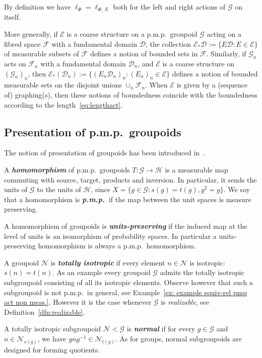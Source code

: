 \documentclass[AHL,Unicode,longabstracts,published]{cedram}
\newcommand{\defin}[1]{\textbf{\emph{#1}}}
\newcommand{\coarse}{\mathcal{E}}
\newcommand{\cn}{\mathcal{N}}
\newcommand{\ch}{\mathcal{H}}
\newcommand{\cg}{\mathcal{G}}
\newcommand{\cf}{\mathcal{F}}
\newcommand{\cd}{\mathcal{D}}
\newcommand{\pmp}{p.m.p.\ }
\begin{document}
By definition we have $\ell_\Phi=\ell_{\Phi,\,X}$ both for the left and right actions of $\cg$ on itself.

More generally, if $\coarse$ is a coarse structure on a \pmp groupoid $\cg$ acting on a fibred space $\cf$ with a fundamental domain $\cd$, the collection $\coarse_* \cd := \{ E \cd: E \in \coarse\}$ of measurable subsets of $\cf$ defines a notion of bounded sets in $\cf$. Similarly, if $\cg_n$ acts on $\cf_n$ with a fundamental domain $\cd_n$, and $\coarse$ is a coarse structure on $(\cg_n)_n$, then $\coarse_* (\cd_n) := \{ (E_n \cd_n)_n: (E_n)_n \in \coarse\}$ defines a notion of bounded measurable sets on the disjoint unions $\cup_n \cf_n$. When $\coarse$ is given by a (sequence of) graphing(s), then these notions of boundedness coincide with the boundedness according to the length~\eqref{eq:lengthact}.


\subsection{Presentation of \pmp groupoids}\label{subsect: presentation of groupoids}

The notion of presentation of groupoids has been introduced in~\cite{Alv08}.

\begin{defi}\label{def:groupoid_homomorphism}
A \defin{homomorphism} of \pmp groupoids $T:\cg\rightarrow \ch$ is a measurable map commuting with source, target, products and inversion. In particular, it sends the units of $\cg$ to the units of $\ch$, since $X=\{g\in \cg: s(g) = t(g),g^2=g\}$. We say that a homomorphism is
\defin{\pmp}if the map between the unit spaces is measure preserving.

A homomorphism of groupoids is \defin{units-preserving} if the induced map at the level of units is an isomorphism of probability spaces. In particular a units-preserving homomorphism is always a \pmp homomorphism.
\end{defi}

A groupoid $\cn$ is \defin{totally isotropic} if every element $n\in \cn$ is isotropic: $s(n)=t(n)$. As an example every groupoid $\cg$ admits the totally isotropic subgroupoid consisting of all its isotropic elements. Observe however that such a subgroupoid is not \pmp in general, see Example~\ref{ex: example equiv-rel pmp act non meas.}. However it is the case whenever $\cg$ is \emph{realizable}, see Definition~\ref{dfn:realizable}.

A totally isotropic subgroupoid $\cn<\cg$ is
\defin{normal} if for every $g\in \cg$ and $n\in \cn_{s(g)}$, we have $g n g^{-1}\in \cn_{t(g)}$. As for groups, normal subgroupoids are designed for forming quotients.
\end{document}
